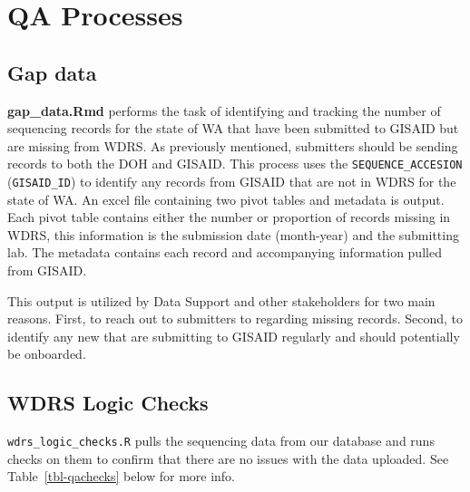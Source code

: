 \documentclass[
]{agujournal2019}
\begin{document}
\section{QA Processes}\label{qa-processes}

\subsection{Gap data}\label{gap-data}

\textbf{gap\_data.Rmd} performs the task of identifying and tracking the
number of sequencing records for the state of WA that have been
submitted to GISAID but are missing from WDRS. As previously mentioned,
submitters should be sending records to both the DOH and GISAID. This
process uses the \texttt{SEQUENCE\_ACCESION} (\texttt{GISAID\_ID}) to
identify any records from GISAID that are not in WDRS for the state of
WA. An excel file containing two pivot tables and metadata is output.
Each pivot table contains either the number or proportion of records
missing in WDRS, this information is the submission date (month-year)
and the submitting lab. The metadata contains each record and
accompanying information pulled from GISAID.

This output is utilized by Data Support and other stakeholders for two
main reasons. First, to reach out to submitters to regarding missing
records. Second, to identify any new that are submitting to GISAID
regularly and should potentially be onboarded.

\subsection{WDRS Logic Checks}\label{wdrs-logic-checks}

\texttt{wdrs\_logic\_checks.R} pulls the sequencing data from our
database and runs checks on them to confirm that there are no issues
with the data uploaded. See Table~\ref{tbl-qachecks} below for more
info.
\end{document}
